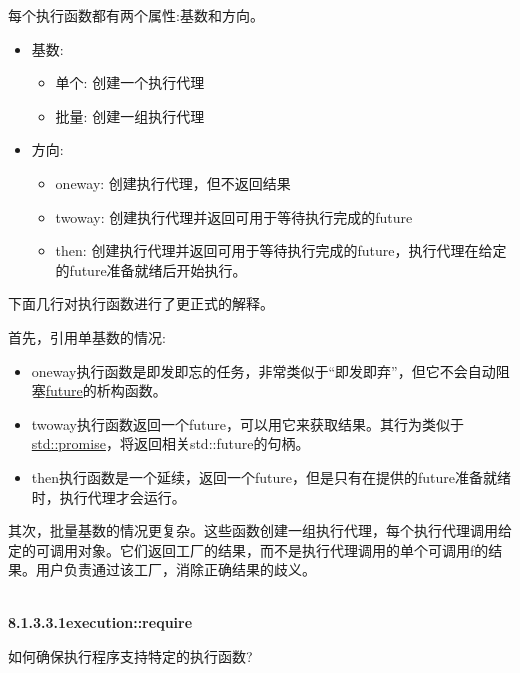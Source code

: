 每个执行函数都有两个属性:基数和方向。

\begin{itemize}
\item 
基数:
\begin{itemize}
\item 
单个: 创建一个执行代理

\item 
批量: 创建一组执行代理
\end{itemize}

\item 
方向:
\begin{itemize}
\item 
oneway: 创建执行代理，但不返回结果

\item
twoway: 创建执行代理并返回可用于等待执行完成的future

\item
then: 创建执行代理并返回可用于等待执行完成的future，执行代理在给定的future准备就绪后开始执行。
\end{itemize}
\end{itemize}

下面几行对执行函数进行了更正式的解释。

首先，引用单基数的情况:

\begin{itemize}
\item 
oneway执行函数是即发即忘的任务，非常类似于“即发即弃”，但它不会自动阻塞\href{https://www.modernescpp.com/index.php/the-special-futures}{future}的析构函数。

\item
twoway执行函数返回一个future，可以用它来获取结果。其行为类似于\href{https://www.modernescpp.com/index.php/promise-and-future}{std::promise}，将返回相关std::future的句柄。

\item
then执行函数是一个延续，返回一个future，但是只有在提供的future准备就绪时，执行代理才会运行。
\end{itemize}

其次，批量基数的情况更复杂。这些函数创建一组执行代理，每个执行代理调用给定的可调用对象。它们返回工厂的结果，而不是执行代理调用的单个可调用f的结果。用户负责通过该工厂，消除正确结果的歧义。

\hspace*{\fill} \\ %
\noindent
\textbf{8.1.3.3.1\hspace{0.2cm}execution::require}

如何确保执行程序支持特定的执行函数?

